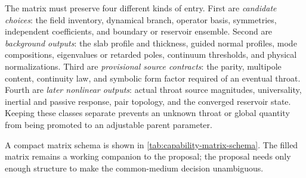 The matrix must preserve four different kinds of entry. First are
\emph{candidate choices}: the field inventory, dynamical branch, operator basis,
symmetries, independent coefficients, and boundary or reservoir ensemble.
Second are \emph{background outputs}: the slab profile and thickness, guided
normal profiles, mode compositions, eigenvalues or retarded poles, continuum
thresholds, and physical normalizations. Third are \emph{provisional source
contracts}: the parity, multipole content, continuity law, and symbolic form
factor required of an eventual throat. Fourth are \emph{later nonlinear
outputs}: actual throat source magnitudes, universality, inertial and passive
response, pair topology, and the converged reservoir state. Keeping these
classes separate prevents an unknown throat or global quantity from being
promoted to an adjustable parent parameter.

A compact matrix schema is shown in \cref{tab:capability-matrix-schema}. The
filled matrix remains a working companion to the proposal; the proposal needs
only enough structure to make the common-medium decision unambiguous.


